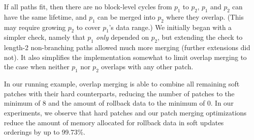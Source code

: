 \noindent
%
If all paths fit, then there are no block-level cycles from $p_1$
to $p_2$, $p_1$ and $p_2$ can have the same lifetime, and $p_1$ can be
merged into $p_2$ where they overlap.
%
(This may require growing $p_2$ to cover $p_1$'s data range.)
%
We initially began with a simpler check, namely that $p_1$ \emph{only}
depended on $p_2$, but extending the check to length-2 non-branching paths
allowed much more merging (further extensions did not).
%
It also simplifies the implementation somewhat to limit overlap merging to
the case when neither $p_1$ nor $p_2$ overlaps with any other patch.



In our running example, overlap merging is able to combine all remaining
soft patches with their hard counterparts, reducing the number of patches
to the minimum of 8 and the amount of rollback data to the minimum of 0.
%
In our experiments, we observe that hard patches and our patch merging
optimizations reduce the amount of memory allocated for rollback data in
soft updates orderings by up to 99.73\%.


\begin{comment}
%
If the only dependency between $p_1$ and $p_2$ is direct---that is, no path
$p_1 \PDepend x \PDepend p_2$ exists for any $x \not\in \{p_1,
p_2\}$---then it will always be possible to write $p_1$ and $p_2$ at the
same time.
%
Specifically, it is possible to write $p_1$ 


Many of these and similar \chdescs\ are mergeable and have
dependencies that allow simple (and fast) reasoning to identify many
of the mergeable pairs: two \chdescs\ on block $b$ that overlap no other \chdescs\ in \PMem[b]
and which have no dependency path from the new to the existing \chdesc\
will not induce a block-level cycle and so are writable together.
We know that \textit{later} changes will not cause them to induce a block-level cycle due to
invariant~\ref{cdinvar:add-before} and by not merging if the new \chdesc\
has a before and the before is marked as allowed to violate
invariant~\ref{cdinvar:add-before}.
%
While path existence testing is expensive, a conservative path test
of only a depth of two identifies most mergeable \chdescs. If the new
\chdesc\ has an explicit \before\ that is not the existing \chdesc\ and
this \before\ has a \before, then there may be a path to the existing
\chdesc.
%
To merge two such overlapping \chdescs, add the new \chdesc's explicit
before to the existing \chdesc\ (if any and if not the existing \chdesc).



At the end of \chdesc\ optimizations, say something along the lines:
%
The dynamic optimizations facilitated through \nrb\
\chdescs\ implement the efficiency in systems using soft updates or
journaling\todo{Actually do this for journaling} while expressing
changes modularly through structural descriptions rather than through
internal and semantic file system descriptions.

\todo{Should we talk about why we allow NRBs and merging to be
  disabled? (Debugging simplicity and depend add to \noop\ \chdescs\
  with \afters\ bug catching.)}
\end{comment}
